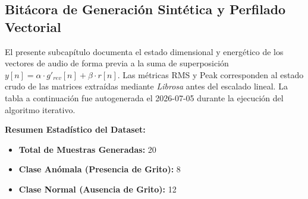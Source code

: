 \subsection{Bitácora de Generación Sintética y Perfilado Vectorial}

El presente subcapítulo documenta el estado dimensional y energético de los vectores de audio de forma previa a la suma de superposición $y[n] = \alpha \cdot g'_{rev}[n] + \beta \cdot r[n]$. Las métricas RMS y Peak corresponden al estado crudo de las matrices extraídas mediante \textit{Librosa} antes del escalado lineal. La tabla a continuación fue autogenerada el 2026-07-05 durante la ejecución del algoritmo iterativo.

\textbf{Resumen Estadístico del Dataset:}
\begin{itemize}
    \item \textbf{Total de Muestras Generadas:} 20
    \item \textbf{Clase Anómala (Presencia de Grito):} 8
    \item \textbf{Clase Normal (Ausencia de Grito):} 12
\end{itemize}

